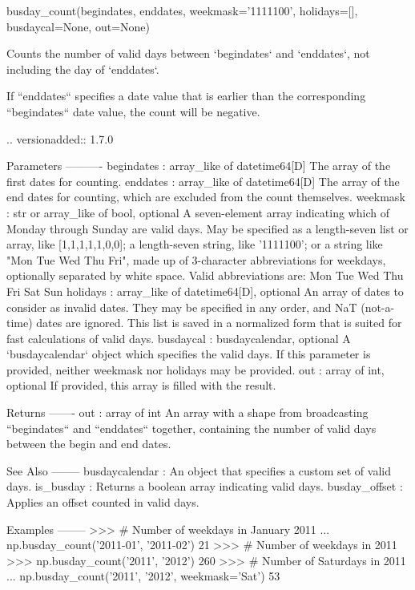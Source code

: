 \begin{DoxyVerb}busday_count(begindates, enddates, weekmask='1111100', holidays=[], busdaycal=None, out=None)

Counts the number of valid days between `begindates` and
`enddates`, not including the day of `enddates`.

If ``enddates`` specifies a date value that is earlier than the
corresponding ``begindates`` date value, the count will be negative.

.. versionadded:: 1.7.0

Parameters
----------
begindates : array_like of datetime64[D]
    The array of the first dates for counting.
enddates : array_like of datetime64[D]
    The array of the end dates for counting, which are excluded
    from the count themselves.
weekmask : str or array_like of bool, optional
    A seven-element array indicating which of Monday through Sunday are
    valid days. May be specified as a length-seven list or array, like
    [1,1,1,1,1,0,0]; a length-seven string, like '1111100'; or a string
    like "Mon Tue Wed Thu Fri", made up of 3-character abbreviations for
    weekdays, optionally separated by white space. Valid abbreviations
    are: Mon Tue Wed Thu Fri Sat Sun
holidays : array_like of datetime64[D], optional
    An array of dates to consider as invalid dates.  They may be
    specified in any order, and NaT (not-a-time) dates are ignored.
    This list is saved in a normalized form that is suited for
    fast calculations of valid days.
busdaycal : busdaycalendar, optional
    A `busdaycalendar` object which specifies the valid days. If this
    parameter is provided, neither weekmask nor holidays may be
    provided.
out : array of int, optional
    If provided, this array is filled with the result.

Returns
-------
out : array of int
    An array with a shape from broadcasting ``begindates`` and ``enddates``
    together, containing the number of valid days between
    the begin and end dates.

See Also
--------
busdaycalendar : An object that specifies a custom set of valid days.
is_busday : Returns a boolean array indicating valid days.
busday_offset : Applies an offset counted in valid days.

Examples
--------
>>> # Number of weekdays in January 2011
... np.busday_count('2011-01', '2011-02')
21
>>> # Number of weekdays in 2011
>>> np.busday_count('2011', '2012')
260
>>> # Number of Saturdays in 2011
... np.busday_count('2011', '2012', weekmask='Sat')
53
\end{DoxyVerb}
 \mbox{\label{namespacenumpy_1_1core_1_1multiarray_a08438fa4045c8d1a7c606aa38904f4f3}} 
